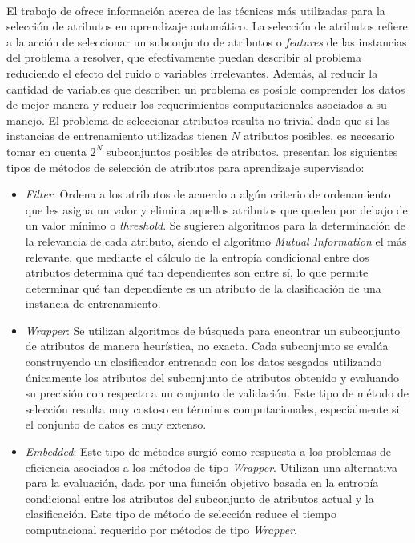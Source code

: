 \paragraph{} El trabajo de \citet{fs-survey} ofrece información acerca de las técnicas más utilizadas para la selección de atributos en aprendizaje automático. La selección de atributos refiere a la acción de seleccionar un subconjunto de atributos o \textit{features} de las instancias del problema a resolver, que efectivamente puedan describir al problema reduciendo el efecto del ruido o variables irrelevantes. Además, al reducir la cantidad de variables que describen un problema es posible comprender los datos de mejor manera y reducir los requerimientos computacionales asociados a su manejo. El problema de seleccionar atributos resulta no trivial dado que si las instancias de entrenamiento utilizadas tienen $N$ atributos posibles, es necesario tomar en cuenta $2^N$ subconjuntos posibles de atributos. \citet{fs-survey} presentan los siguientes tipos de métodos de selección de atributos para aprendizaje supervisado:
\begin{itemize}
\item \textit{Filter}: Ordena a los atributos de acuerdo a algún criterio de ordenamiento que les asigna un valor y elimina aquellos atributos que queden por debajo de un valor mínimo o \textit{threshold}. Se sugieren algoritmos para la determinación de la relevancia de cada atributo, siendo el algoritmo \textit{Mutual Information} el más relevante, que mediante el cálculo de la entropía condicional entre dos atributos determina qué tan dependientes son entre sí, lo que permite determinar qué tan dependiente es un atributo de la clasificación de una instancia de entrenamiento.
\item \textit{Wrapper}: Se utilizan algoritmos de búsqueda para encontrar un subconjunto de atributos de manera heurística, no exacta. Cada subconjunto se evalúa construyendo un clasificador entrenado con los datos sesgados utilizando únicamente los atributos del subconjunto de atributos obtenido y evaluando su precisión con respecto a un conjunto de validación. Este tipo de método de selección resulta muy costoso en términos computacionales, especialmente si el conjunto de datos es muy extenso.
\item \textit{Embedded}: Este tipo de métodos surgió como respuesta a los problemas de eficiencia asociados a los métodos de tipo \textit{Wrapper}. Utilizan una alternativa para la evaluación, dada por una función objetivo basada en la entropía condicional entre los atributos del subconjunto de atributos actual y la clasificación.
Este tipo de método de selección reduce el tiempo computacional requerido por métodos de tipo \textit{Wrapper}.
\end{itemize}
